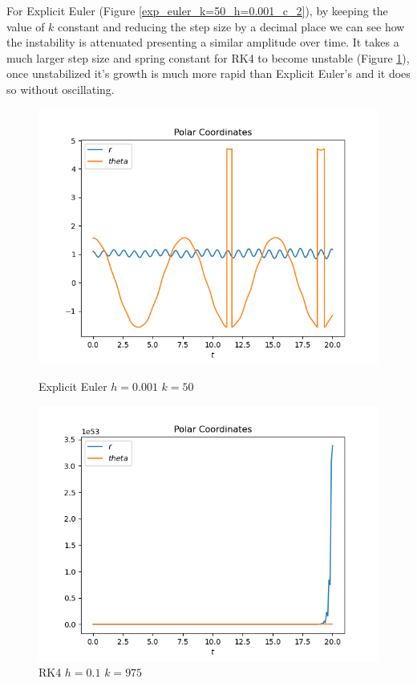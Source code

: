 \documentclass{report}
\newcounter{constant}
\begin{document}
For Explicit Euler (Figure \ref{exp_euler_k=50_h=0.001_c_2}), by keeping the value of $k$ constant and reducing the step size by a decimal place we can see how the instability is attenuated presenting a similar amplitude over time.
It takes a much larger step size and spring constant for RK4 to become unstable (Figure \ref{rk4_h=0.1_k=975_c}), once unstabilized it’s growth is much more rapid than Explicit Euler’s and it does so without oscillating.

\begin{figure}[h]
\centering
\begin{minipage}[b]{0.45\textwidth}
\centering
\includegraphics[width=\textwidth]{../Plots/ExpEuler/exp_euler_k=50_h=0.001_c}
\caption{Explicit Euler $h=0.001$ $k=50$}
\label{exp_euler_k=50_h=0.001_c_2}
\end{minipage}
\hfill
\begin{minipage}[b]{0.45\textwidth}
\centering
\includegraphics[width=\textwidth]{../Plots/RK4/rk4_h=0.1_k=975_c}
\caption{RK4 $h=0.1$ $k=975$}
\label{rk4_h=0.1_k=975_c}
\end{minipage}
\end{figure}
\end{document}
